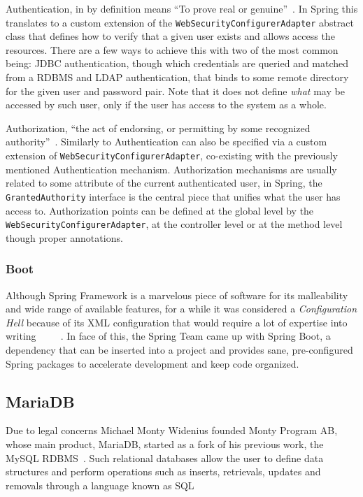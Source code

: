 Authentication, in by definition means ``To prove real or genuine''~\cite{merriamwebster}. In Spring this translates to a custom extension of the \texttt{WebSecurityConfigurerAdapter} abstract class that defines how to verify that a given user exists and allows access the resources. There are a few ways to achieve this with two of the most common being: \gls{JDBC} authentication, though which credentials are queried and matched from a \gls{RDBMS} and \gls{LDAP} authentication, that binds to some remote directory for the given user and password pair. Note that it does not define \textit{what} may be accessed by such user, only if the user has access to the system as a whole.

Authorization, ``the act of endorsing, or permitting by some recognized authority''~\cite{merriamwebster}. Similarly to Authentication can also be specified via a custom extension of \texttt{WebSecurityConfigurerAdapter}, co-existing with the previously mentioned Authentication mechanism. Authorization mechanisms are usually related to some attribute of the current authenticated user, in Spring, the \texttt{GrantedAuthority} interface is the central piece that unifies what the user has access to. Authorization points can be defined at the global level by the \texttt{WebSecurityConfigurerAdapter}, at the controller level or at the method level though proper annotations.

\subsubsection{Boot}
Although Spring Framework is a marvelous piece of software for its malleability and wide range of available features, for a while it was considered a \textit{Configuration Hell} because of its \gls{XML} configuration that would require a lot of expertise into writing~\cite{xmlhell1}~\cite{xmlhell2}~\cite{xmlhell3}~\cite{xmlhell4}~\cite{xmlhell5}. In face of this, the Spring Team came up with Spring Boot, a dependency that can be inserted into a project and provides sane, pre-configured Spring packages to accelerate development and keep code organized.

\subsection{MariaDB}
Due to legal concerns Michael Monty Widenius founded Monty Program AB, whose main product, MariaDB, started as a fork of his previous work, the MySQL \gls{RDBMS}~\cite{MAVRO:2014}. Such relational databases allow the user to define data structures and perform operations such as inserts, retrievals, updates and removals through a language known as \gls{SQL}

